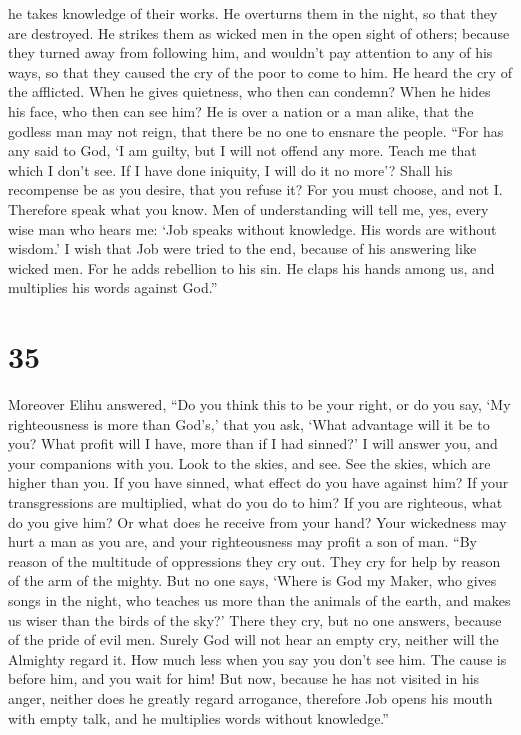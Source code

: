 he takes knowledge of their works. He overturns them in the night, so
that they are destroyed.  He strikes them as wicked men
in the open sight of others;  because they turned away
from following him, and wouldn't pay attention to any of his ways,
 so that they caused the cry of the poor to come to him.
He heard the cry of the afflicted.  When he gives
quietness, who then can condemn? When he hides his face, who then can
see him? He is over a nation or a man alike,  that the
godless man may not reign, that there be no one to ensnare the people.
 ``For has any said to God, `I am guilty, but I will not
offend any more.  Teach me that which I don't see. If I
have done iniquity, I will do it no more'?  Shall his
recompense be as you desire, that you refuse it? For you must choose,
and not I. Therefore speak what you know.  Men of
understanding will tell me, yes, every wise man who hears me:
 `Job speaks without knowledge. His words are without
wisdom.'  I wish that Job were tried to the end, because
of his answering like wicked men.  For he adds rebellion
to his sin. He claps his hands among us, and multiplies his words
against God.''

\hypertarget{section-34}{%
\section{35}\label{section-34}}

 Moreover Elihu answered,  ``Do you think
this to be your right, or do you say, `My righteousness is more than
God's,'  that you ask, `What advantage will it be to you?
What profit will I have, more than if I had sinned?'  I
will answer you, and your companions with you.  Look to
the skies, and see. See the skies, which are higher than you.
 If you have sinned, what effect do you have against him?
If your transgressions are multiplied, what do you do to him?
 If you are righteous, what do you give him? Or what does
he receive from your hand?  Your wickedness may hurt a man
as you are, and your righteousness may profit a son of man.
 ``By reason of the multitude of oppressions they cry out.
They cry for help by reason of the arm of the mighty. 
But no one says, `Where is God my Maker, who gives songs in the night,
 who teaches us more than the animals of the earth, and
makes us wiser than the birds of the sky?'  There they
cry, but no one answers, because of the pride of evil men.
 Surely God will not hear an empty cry, neither will the
Almighty regard it.  How much less when you say you don't
see him. The cause is before him, and you wait for him! 
But now, because he has not visited in his anger, neither does he
greatly regard arrogance,  therefore Job opens his mouth
with empty talk, and he multiplies words without knowledge.''

